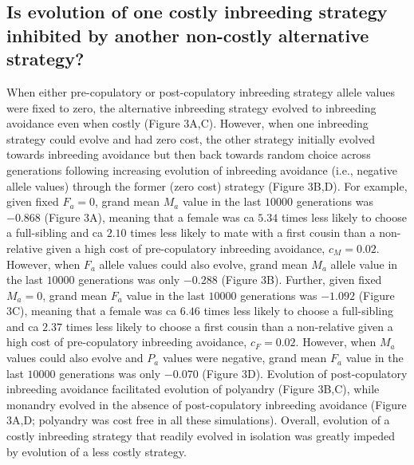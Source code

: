 \documentclass[10pt,letterpaper]{article}
\begin{document}
\subsection*{Is evolution of one costly inbreeding strategy inhibited by another non-costly alternative strategy?}

When either pre-copulatory or post-copulatory inbreeding strategy allele values were fixed to zero, the alternative inbreeding strategy evolved to inbreeding avoidance even when costly (Figure 3A,C). However, when one inbreeding strategy could evolve and had zero cost, the other strategy initially evolved towards inbreeding avoidance but then back towards random choice across generations following increasing evolution of inbreeding avoidance (i.e., negative allele values) through the former (zero cost) strategy (Figure 3B,D). For example, given fixed $F_{a}=0$, grand mean $M_{a}$ value in the last $10000$ generations was $-0.868$ (Figure 3A), meaning that a female was ca $5.34$ times less likely to choose a full-sibling and ca $2.10$ times less likely to mate with a first cousin than a non-relative given a high cost of pre-copulatory inbreeding avoidance, $c_{M}=0.02$. However, when $F_{a}$ allele values could also evolve, grand mean $M_{a}$ allele value in the last $10000$ generations was only $-0.288$ (Figure 3B). Further, given fixed $M_{a}=0$, grand mean $F_{a}$ value in the last $10000$ generations was $-1.092$ (Figure 3C), meaning that a female was ca $6.46$ times less likely to choose a full-sibling and ca $2.37$ times less likely to choose a first cousin than a non-relative given a high cost of pre-copulatory inbreeding avoidance, $c_{F}=0.02$. However, when $M_{a}$ values could also evolve and $P_{a}$ values were negative, grand mean $F_{a}$ value in the last $10000$ generations was only $-0.070$ (Figure 3D). Evolution of post-copulatory inbreeding avoidance facilitated evolution of polyandry (Figure 3B,C), while monandry evolved in the absence of post-copulatory inbreeding avoidance (Figure 3A,D; polyandry was cost free in all these simulations). Overall, evolution of a costly inbreeding strategy that readily evolved in isolation was greatly impeded by evolution of a less costly strategy.
\end{document}
